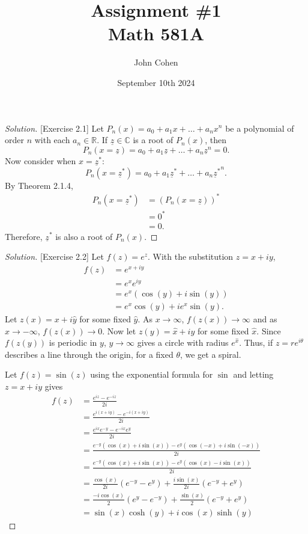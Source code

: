 \documentclass[11pt,letterpaper]{article}
\title{Assignment \#1\\Math 581A}
\author{
	John Cohen
}
\date{September 10th 2024}
\newcommand{\C}{\mathbb{C}}
\newcommand{\R}{\mathbb{R}}
\newenvironment{solution}
{\renewcommand\qedsymbol{}\begin{proof}[Solution]}
	{\end{proof}\bigskip}
\begin{document}
	
	\maketitle
	
\begin{solution}[Exercise 2.1]
	Let $P_n(x) = a_0 + a_1x + \dotsc + a_nx^n$ be a polynomial of order $n$ with each $a_n \in \R$. If $\underline z \in \C$ is a root of $P_n(x)$, then $$P_n(x = \underline z) = a_0 + a_1\underline z + \dotsc + a_n\underline z^n = 0.$$ Now consider when $x = \underline z^*$: $$P_n(x = \underline z^*) = a_0 + a_1\underline z^* + \dotsc + a_n{\underline z^*}^n.$$ By Theorem 2.1.4, 
	\[\begin{split}
		P_n(x = \underline z^*) &= (P_n(x = \underline z))^*\\
		&= 0^*\\
		&= 0.
	\end{split}\]
	Therefore, $\underline z^*$ is also a root of $P_n(x)$. 
\end{solution}

\begin{solution}[Exercise 2.2]
	Let $f(z) = e^z$. With the substitution $z = x + iy$,
	\[\begin{split}
		f(z) &= e^{x+iy}\\
		&=e^xe^{iy}\\
		&=e^x(\cos(y)+i\sin(y))\\
		&= e^x\cos(y) +ie^x\sin(y).
	\end{split}\]
	Let $z(x) = x + i\hat y$ for some fixed $\hat y$. As $x \to \infty$, $f(z(x)) \to \infty$ and as $x \to -\infty$, $f(z(x)) \to 0$. Now let $z(y) = \hat x + iy$ for some fixed $\hat x$. Since $f(z(y))$ is periodic in $y$, $y\to \infty$ gives a circle with radius $e^{\hat x}$. Thus, if $z = re^{i\theta}$ describes a line through the origin, for a fixed $\theta$, we get a spiral.
	
	Let $f(z) = \sin(z)$ using the exponential formula for $\sin$ and letting $z = x+iy$ gives
	\[\begin{split}
		f(z) &= \frac{e^{iz}-e^{-iz}}{2i}\\
		&= \frac{e^{i(x+iy)}-e^{-i(x+iy)}}{2i}\\
		&= \frac{e^{ix}e^{-y} -e^{-ix}e^{y}}{2i}\\
		&= \frac{e^{-y}(\cos(x)+i\sin(x))-e^y(\cos(-x)+i\sin(-x))}{2i}\\
		&= \frac{e^{-y}(\cos(x)+i\sin(x))-e^y(\cos(x)-i\sin(x))}{2i}\\
		&= \frac{\cos(x)}{2i}(e^{-y}-e^y)+\frac{i\sin(x)}{2i}(e^{-y}+e^y)\\
		&= \frac{-i\cos(x)}{2}(e^{y}-e^{-y})+\frac{\sin(x)}{2}(e^{-y}+e^y)\\
		& = \sin(x)\cosh(y) + i\cos(x)\sinh(y)
	\end{split}\]
	\end{solution}	
\end{document}
